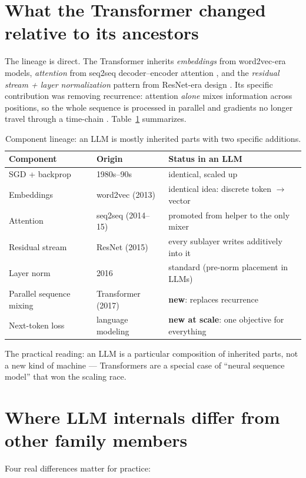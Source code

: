 \documentclass[11pt]{article}
\begin{document}
\section{What the Transformer changed relative to its ancestors}
The lineage is direct. The Transformer inherits \emph{embeddings} from word2vec-era models, \emph{attention} from seq2seq decoder--encoder attention \cite{bahdanau2015attention}, and the \emph{residual stream + layer normalization} pattern from ResNet-era design \cite{he2016resnet}. Its specific contribution was removing recurrence: attention \emph{alone} mixes information across positions, so the whole sequence is processed in parallel and gradients no longer travel through a time-chain \cite{vaswani2017attention}. Table~\ref{tab:lineage} summarizes.

\begin{table}[h]
\centering
\begin{tabular}{llp{6.2cm}}
\hline
Component & Origin & Status in an LLM \\
\hline
SGD + backprop & 1980s--90s & identical, scaled up \\
Embeddings & word2vec (2013) & identical idea: discrete token $\to$ vector \\
Attention & seq2seq (2014--15) & promoted from helper to the only mixer \\
Residual stream & ResNet (2015) & every sublayer writes additively into it \\
Layer norm & 2016 & standard (pre-norm placement in LLMs) \\
Parallel sequence mixing & Transformer (2017) & \textbf{new}: replaces recurrence \\
Next-token loss & language modeling & \textbf{new at scale}: one objective for everything \\
\hline
\end{tabular}
\caption{Component lineage: an LLM is mostly inherited parts with two specific additions.}
\label{tab:lineage}
\end{table}

The practical reading: an LLM is a particular composition of inherited parts, not a new kind of machine --- Transformers are a special case of ``neural sequence model'' that won the scaling race.

\section{Where LLM internals differ from other family members}
Four real differences matter for practice:
\end{document}

